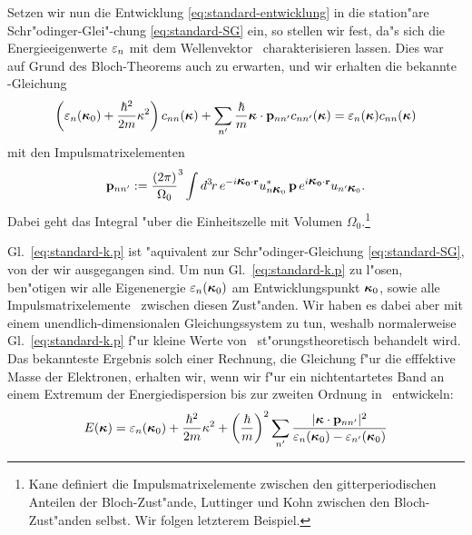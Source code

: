 Setzen wir nun die Entwicklung \eqref{eq:standard-entwicklung} in die
station"are Schr"odinger-Glei"-chung \eqref{eq:standard-SG} ein, so stellen wir
fest, da"s sich die Energieeigenwerte $\varepsilon_{n}$ mit dem Wellenvektor \ak\ 
charakterisieren lassen. Dies war auf Grund des Bloch-Theorems auch zu
erwarten, und wir erhalten die bekannte \kdotp-Gleichung
%
\begin{equation}
  \label{eq:standard-k.p}
   \left( \veps_{n}(\ak_{0}) + \frac{\hbar^{2}}{2m}\akb^{2} \right) c_{nn}(\ak)
  + \sum_{\pri{n}} \frac{\hbar}{m} \sprod{\ak}{\pnn} c_{n\pri{n}}(\ak)
  = \veps_{n}(\ak) c_{nn}(\ak)
\end{equation}
%
mit den Impulsmatrixelementen
%
\begin{equation}
  \label{eq:pnn}
  \pnn := {\frac{(2\pi)}{\Omega_{0}}}^{3} \int \vdx{r}
  e^{-i\sprod{\ak_{0}}{r}} \cc{u_{n\ak_{0}}} \, \op{\vec{p}} \,
  e^{i\sprod{\ak_{0}}{r}} u_{\pri{n}\ak_{0}}.
\end{equation}
%
Dabei geht das Integral "uber die Einheitszelle mit Volumen
$\Omega_{0}$.\footnote{Kane \cite{kane:66} definiert die Impulsmatrixelemente
  zwischen den gitterperiodischen Anteilen der Bloch-Zust"ande, Luttinger und
  Kohn \cite{luko:55} zwischen den Bloch-Zust"anden selbst. Wir folgen
  letzterem Beispiel.}

Gl.~\eqref{eq:standard-k.p} ist "aquivalent zur Schr"odinger-Gleichung
\eqref{eq:standard-SG}, von der wir ausgegangen sind. Um nun
Gl.~\eqref{eq:standard-k.p} zu l"osen, ben"otigen wir alle Eigenenergie
$\veps_{n}(\ak_{0})$ am Entwicklungspunkt $\ak_{0}$, sowie alle
Impulsmatrixelemente \pnn\ zwischen diesen Zust"anden. Wir haben es dabei aber
mit einem unendlich-dimensionalen Gleichungssystem zu tun, weshalb
normalerweise Gl.~\eqref{eq:standard-k.p} f"ur kleine Werte von \akb\ 
st"orungstheoretisch behandelt wird. Das bekannteste Ergebnis solch
einer Rechnung, die Gleichung f"ur die efffektive Masse der Elektronen,
erhalten wir, wenn wir f"ur ein nichtentartetes Band an einem Extremum der
Energiedispersion bis zur zweiten Ordnung in \akb\ entwickeln:
%
\begin{equation}
  \label{eq:standard-m*}
  E(\ak) = \veps_{n}(\ak_{0}) + \frac{\hbar^{2}}{2m}\akb^{2} + 
  \left(\frac{\hbar}{m}\right)^{2} \sum_{\pri{n}}
  \frac{|\sprod{\ak}{\pnn}|^{2}}{\veps_{n}(\ak_{0})-\veps_{\pri{n}}(\ak_{0})}
\end{equation}

